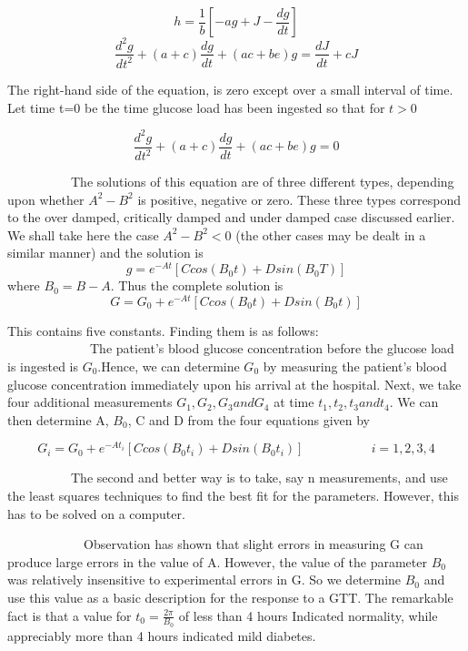 $$h=\frac{1}{b}[-ag+J-\frac{dg}{dt}]$$
$$\frac{d^{2}g}{dt^{2}}+(a+c)\frac{dg}{dt}+(ac+be)g=\frac{dJ}{dt}+cJ$$

The right-hand side of the equation, is zero except over a small interval of time. Let time t=0 be the time glucose load has been ingested so that for $t>0$

$$\frac{d^{2}g}{dt^{2}}+(a+c)\frac{dg}{dt}+(ac+be)g=0$$         

\par  ~~~~~~~~~~The solutions of this  equation are of three different types, depending upon whether $A^{2}-B^{2}$ is positive, negative or zero. These three types correspond to the over damped, critically damped and under damped case discussed earlier. We shall       take here the case $A^{2}-B^{2}<0$ (the other cases may be dealt in a similar manner) and the solution is
$$g=e^{-At}[Ccos(B_{0}t)+Dsin(B_{0}T)]$$ where $B_{0}=B-A$. Thus the complete solution is
$$G=G_{0}+e^{-At}[Ccos(B_{0}t)+Dsin(B_{0}t)]$$          

This contains five constants. Finding them is as follows:\\

~~~~~~~~~~~~~The patient's blood glucose concentration before the glucose load is ingested is $G_{0}$.Hence, we can determine             $G_{0}$ by measuring the patient's blood glucose concentration immediately upon his arrival at the hospital. Next, we take four additional measurements $G_{1}, G_{2}, G_{3} and G_{4}$ at time $t_{1}, t_{2}, t_{3} and t_{4}$. We can then determine A, $B_{0}$, C and D from the four equations given by

$$G_{i}=G_{0}+e^{-At_{i}}[Ccos(B_{0}t_{i})+Dsin(B_{0}t_{i})]~~~~~~~~~~~~~~~~~~~~~~~~i=1,2,3,4$$      

\par ~~~~~~~~~~The second and better way is to take, say n measurements, and use the least squares techniques to find the best fit for the parameters. However, this has to be solved on a computer.

\par ~~~~~~~~~~~~Observation has shown that slight errors in measuring G can produce large errors in the value of A. However, the value of the parameter $B_{0}$ was relatively insensitive to experimental errors in G. So we determine $B_{0}$ and use this value as a basic description for the response to a GTT.  The remarkable fact is that a value for $t_{0}=\frac{2\pi}{B_{0}}$ of less than 4 hours Indicated normality, while appreciably more than 4 hours indicated mild diabetes.




